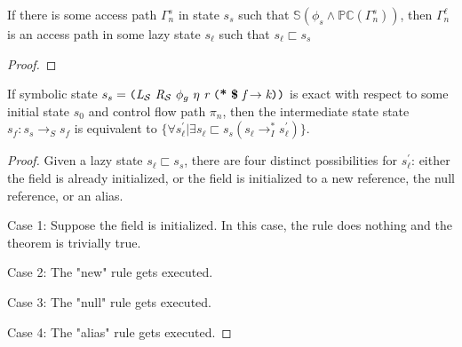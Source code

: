 \begin{lemma}
\label{lem:path}
If there is some access path $\Gamma_n^s$ in state $s_s$ such that $\mathbb{S}(\phi_s \wedge \mathbb{PC}(\Gamma_n^s))$, then $\Gamma_n^\ell$ is an access path in some lazy state $s_\ell$ such that $s_\ell \sqsubset s_s$
\end{lemma}
\begin{proof}
\end{proof}

\begin{lemma}
\label{lem:init}
If symbolic state $s_s = \lp \cfgnt{L}_{\mathcal{S}}\ \cfgnt{R}_{\mathcal{S}}\ \phi_g\ \eta\ \cfgnt{r}\ \lp \cfgt{*}\ \cfgt{\$}\ \cfgnt{f} \rightarrow \cfgnt{k}\rp \rp$ is exact with respect to some initial state $s_0$ and control flow path $\pi_n$, then the intermediate state state $s_f : s_s \rightarrow_S s_f$ is equivalent to $\{\forall s_\ell^\prime | \exists s_\ell \sqsubset s_s (s_\ell \rightarrow_I^* s_\ell^\prime)  \}$.
\end{lemma}

\begin{proof}%
Given a lazy state $s_\ell \sqsubset s_s$, there are four distinct possibilities for $s_\ell^\prime$: either the field is already initialized, or the field is initialized to a new reference, the null reference, or an alias.

Case 1: Suppose the field is initialized. In this case, the rule does nothing and the theorem is trivially true.


Case 2: The "new" rule gets executed. 

Case 3: The "null" rule gets executed.

Case 4: The "alias" rule gets executed.
\end{proof}

